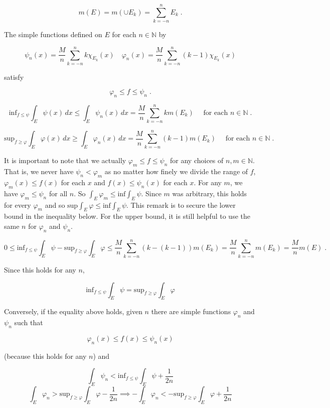 \documentclass[a4paper]{article}
\begin{document}
$$ m(E) = m\left(\cup E_k \right) = \sum_{k=-n}^n E_k \;.$$

The simple functions defined on $E$ for each $n\in \mathbb{N}$ by

$$\psi_n(x) = \frac{M}{n}\sum_{k=-n}^n k \chi_{E_k}(x) \quad \varphi_n(x) = \frac{M}{n}\sum_{k=-n}^n (k-1)\chi_{E_k}(x) $$

satisfy

$$ \varphi_n \leq f \leq \psi_n \;.$$

$$\text{inf}_{f\leq \psi} \int_E \psi(x) \, dx \leq \int_E \psi_n(x) \, dx = \frac{M}{n}\sum_{k=-n}^n k m(E_k) \quad \text{ for each } n \in \mathbb{N} \;.$$

$$\text{sup}_{f\geq \varphi} \int_E \varphi(x) \, dx \geq \int_E \varphi_n(x) \, dx = \frac{M}{n}\sum_{k=-n}^n (k-1) m(E_k) \quad \text{ for each } n \in \mathbb{N} \;.$$

It is important to note that we actually $\varphi_m \leq f \leq \psi_n$ for any choices of $n,m \in \mathbb{N}$. That is, we never have $\psi_n < \varphi_m$ as no matter how finely we divide the range of $f$, $\varphi_m(x) \leq f(x)$ for each $x$ and $f(x) \leq \psi_n(x)$ for each $x$. For any $m$, we have $\varphi_m \leq \psi_n$ for all $n$. So $\int_E \varphi_m \leq \text{inf} \int_E \psi$. Since $m$ was arbitrary, this holds for every $\varphi_m$ and so $\text{sup} \int_E \varphi \leq \text{inf} \int_E \psi$. This remark is to secure the lower bound in the inequality below. For the upper bound, it is still helpful to use the same $n$ for $\varphi_n$ and $\psi_n$. 

$$0 \leq \text{inf}_{f\leq \psi} \int_E \psi - \text{sup}_{f\geq \varphi} \int_E \varphi \leq \frac{M}{n}\sum_{k=-n}^n (k - (k-1))m(E_k) = \frac{M}{n}\sum_{k=-n}^n m(E_k) = \frac{M}{n}m(E) \;.$$

Since this holds for any $n$,

$$\text{inf}_{f\leq \psi} \int_E \psi = \text{sup}_{f\geq \varphi} \int_E \varphi$$

Conversely, if the equality above holds, given $n$ there are simple functions $\varphi_n$ and $\psi_n$ such that 

$$\varphi_n(x) \leq f(x) \leq \psi_n(x) $$

(because this holds for any $n$) and 

$$\int_E \psi_n < \text{inf}_{f\leq \psi} \int_E \psi  + \frac{1}{2n} $$
$$\int_E \varphi_n > \text{sup}_{f\geq \varphi} \int_E \varphi - \frac{1}{2n} \implies -\int_E \varphi_n < -\text{sup}_{f\geq \varphi} \int_E \varphi + \frac{1}{2n}$$
\end{document}
